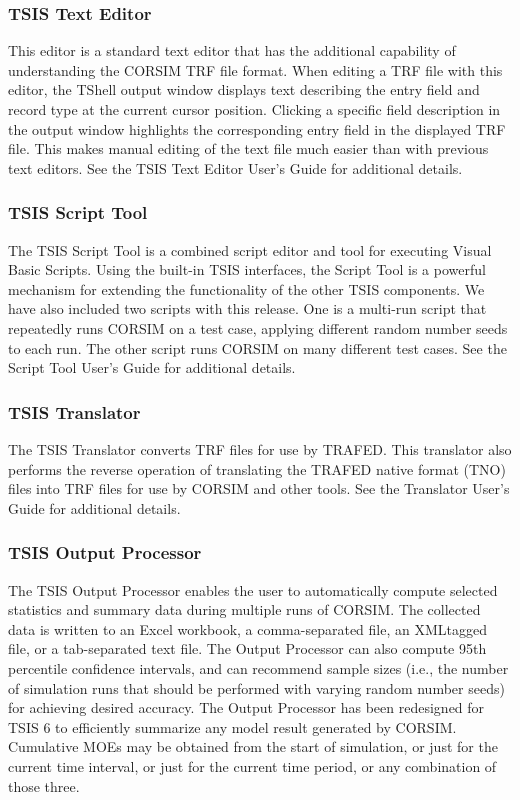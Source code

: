 \subsubsection{TSIS Text Editor}

This editor is a standard text editor that has the additional capability of understanding the CORSIM TRF file
format. When editing a TRF file with this editor, the TShell output window displays text describing the entry field
and record type at the current cursor position. Clicking a specific field description in the output window highlights
the corresponding entry field in the displayed TRF file. This makes manual editing of the text file much easier than
with previous text editors. See the TSIS Text Editor User's Guide for additional details.

\subsubsection{TSIS Script Tool}

The TSIS Script Tool is a combined script editor and tool for executing Visual Basic Scripts. Using the built-in
TSIS interfaces, the Script Tool is a powerful mechanism for extending the functionality of the other TSIS
components. We have also included two scripts with this release. One is a multi-run script that repeatedly runs
CORSIM on a test case, applying different random number seeds to each run. The other script runs CORSIM on
many different test cases. See the Script Tool User's Guide for additional details.

\subsubsection{TSIS Translator}

The TSIS Translator converts TRF files for use by TRAFED. This translator also performs the reverse operation of
translating the TRAFED native format (TNO) files into TRF files for use by CORSIM and other tools. See the
Translator User's Guide for additional details.

\subsubsection{TSIS Output Processor}

The TSIS Output Processor enables the user to automatically compute selected statistics and summary data during
multiple runs of CORSIM. The collected data is written to an Excel workbook, a comma-separated file, an XMLtagged
file, or a tab-separated text file. The Output Processor can also compute 95th percentile confidence intervals,
and can recommend sample sizes (i.e., the number of simulation runs that should be performed with varying random
number seeds) for achieving desired accuracy. The Output Processor has been redesigned for TSIS 6 to efficiently
summarize any model result generated by CORSIM. Cumulative MOEs may be obtained from the start of
simulation, or just for the current time interval, or just for the current time period, or any combination of those three.

